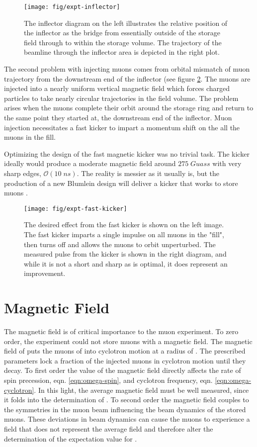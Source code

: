 \begin{figure}
\label{fig:expt-inflector}
\texttt{[image: fig/expt-inflector]}
\caption{The inflector diagram on the left illustrates the relative position of the inflector as the bridge from essentially outside of the storage field through to within the storage volume.  The trajectory of the beamline through the inflector area is depicted in the right plot.}
\end{figure}

The second problem with injecting muons comes from orbital mismatch of muon trajectory from the downstream end of the inflector (see figure \ref{fig:expt-fast-kicker}.  The muons are injected into a nearly uniform vertical magnetic field which forces charged particles to take nearly circular trajectories in the field volume.  The problem arises when the muons complete their orbit around the storage ring and return to the same point they started at, the downstream end of the inflector.  Muon injection necessitates a fast kicker to impart a momentum shift on the all the muons in the fill.

Optimizing the design of the \gmtwo fast magnetic kicker was no trivial task.  The kicker ideally would produce a moderate magnetic field around $275\;Guass$ with very sharp edges, $\mathcal{O}(10\;ns)$. The reality is messier as it usually is, but the production of a new Blumlein design will deliver a kicker that works to store muons \cite{e989-tdr}.  

\begin{figure}
\label{fig:expt-fast-kicker}
\texttt{[image: fig/expt-fast-kicker]}
\caption{The desired effect from the fast kicker is shown on the left image.  The fast kicker imparts a single impulse on all muons in the "fill", then turns off and allows the muons to orbit unperturbed.  The measured pulse from the kicker is shown in the right diagram, and while it is not a short and sharp as is optimal, it does represent an improvement.}
\end{figure}

\section{Magnetic Field}

The magnetic field is of critical importance to the muon \gmtwo experiment. To zero order, the experiment could not store muons with a magnetic field.  The magnetic field of \bmagic puts the muons of \pmagic into cyclotron motion at a radius of \rmagic.  The prescribed parameters lock a fraction of the injected muons in cyclotron motion until they decay.  To first order the value of the magnetic field directly affects the rate of spin precession, eqn. \ref{eqn:omega-spin}, and cyclotron frequency, eqn. \ref{eqn:omega-cyclotron}.  In this light, the average magnetic field must be well measured, since it folds into the determination of \wa.  To second order the magnetic field couples to the symmetries in the muon beam influencing the beam dynamics of the stored muons.  These deviations in beam dynamics can cause the muons to experience a field that does not represent the average field and therefore alter the determination of the expectation value for \wa.

